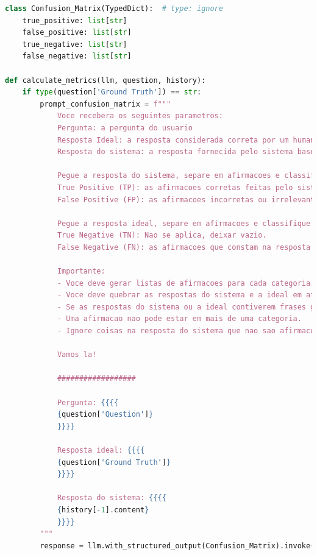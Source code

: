 \begin{lstlisting}[style=mystyle, language=Python, caption={C\'{o}digo para LLM-as-a-Judge}, label={code:llm-judge}]
class Confusion_Matrix(TypedDict):  # type: ignore
    true_positive: list[str]
    false_positive: list[str]
    true_negative: list[str]
    false_negative: list[str]

def calculate_metrics(llm, question, history):
    if type(question['Ground Truth']) == str:
        prompt_confusion_matrix = f"""                
            Voce recebera os seguintes parametros:
            Pergunta: a pergunta do usuario
            Resposta Ideal: a resposta considerada correta por um humano
            Resposta do sistema: a resposta fornecida pelo sistema baseado em IA

            Pegue a resposta do sistema, separe em afirmacoes e classifique cada afirmacao entre as opcoes abaixo:
            True Positive (TP): as afirmacoes corretas feitas pelo sistema, ou seja, que estao presentes na resposta ideal.
            False Positive (FP): as afirmacoes incorretas ou irrelevantes feitas pelo sistema, ou seja, que nao estao presentes na resposta ideal.

            Pegue a resposta ideal, separe em afirmacoes e classifique cada afirmacao entre as opcoes abaixo:
            True Negative (TN): Nao se aplica, deixar vazio.
            False Negative (FN): as afirmacoes que constam na resposta ideal, mas nao foram feitas pelo sistema.

            Importante:
            - Voce deve gerar listas de afirmacoes para cada categoria. 
            - Voce deve quebrar as respostas do sistema e a ideal em afirmacoes objetivas.
            - Se as respostas do sistema ou a ideal contiverem frases grandes com mtas afirmacoes, analisar cada afirmacao separadamente.
            - Uma afirmacao nao pode estar em mais de uma categoria.
            - Ignore coisas na resposta do sistema que nao sao afirmacoes objetivas, como por exemplo citacoes de fontes e links.

            Vamos la!

            ##################

            Pergunta: {{{{
            {question['Question']}
            }}}}

            Resposta ideal: {{{{
            {question['Ground Truth']}
            }}}}

            Resposta do sistema: {{{{
            {history[-1].content}
            }}}}
        """
        response = llm.with_structured_output(Confusion_Matrix).invoke(prompt_confusion_matrix)


\end{lstlisting}
